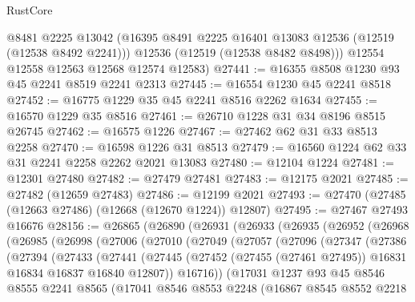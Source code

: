 \begin{lexlean}{RustCore}
\begin{coremodule}
        @8481
        @2225
        @13042
        (@16395 @8491 @2225 @16401 @13083 @12536 (@12519 (@12538 @8492 @2241)))
        @12536
        (@12519 (@12538 @8482 @8498)))
      @12554
      @12558
      @12563
      @12568
      @12574
      @12583)
@27441 := @16355 @8508 @1230 @93 @45 @2241 @8519 @2241 @2313
@27445 := @16554 @1230 @45 @2241 @8518
@27452 := @16775 @1229 @35 @45 @2241 @8516 @2262 @1634
@27455 := @16570 @1229 @35 @8516
@27461 := @26710 @1228 @31 @34 @8196 @8515 @26745
@27462 := @16575 @1226
@27467 := @27462 @62 @31 @33 @8513 @2258
@27470 := @16598 @1226 @31 @8513
@27479 := @16560 @1224 @62 @33 @31 @2241 @2258 @2262 @2021 @13083
@27480 := @12104 @1224
@27481 := @12301 @27480
@27482 := @27479 @27481
@27483 := @12175 @2021
@27485 := @27482 (@12659 @27483)
@27486 := @12199 @2021
@27493 := @27470 (@27485 (@12663 @27486) (@12668 (@12670 @1224)) @12807)
@27495 := @27467 @27493 @16676
@28156 := @26865
    (@26890
      (@26931
        (@26933
          (@26935
            (@26952
              (@26968
                (@26985
                  (@26998
                    (@27006
                      (@27010
                        (@27049
                          (@27057
                            (@27096
                              (@27347
                                (@27386
                                  (@27394
                                    (@27433
                                      (@27441
                                        (@27445
                                          (@27452
                                            (@27455 (@27461 @27495))
                                            @16831
                                            @16834
                                            @16837
                                            @16840
                                            @12807))
                                        @16716))
                                    (@17031
                                      @1237
                                      @93
                                      @45
                                      @8546
                                      @8555
                                      @2241
                                      @8565
                                      (@17041
                                        @8546
                                        @8553
                                        @2248
                                        (@16867
                                          @8545
                                          @8552
                                          @2218

\end{coremodule}
\end{lexlean}
